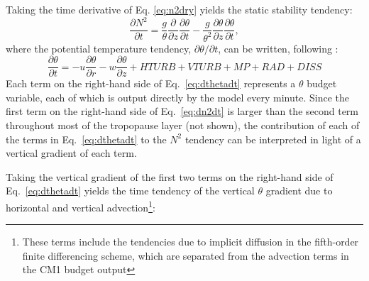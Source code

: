 \documentclass{ametsoc}
\begin{document}
Taking the time derivative of Eq. \ref{eq:n2dry} yields the static stability tendency:
   \begin{equation} \label{eq:dn2dt}
   \frac{\partial N^2}{\partial t} = \frac{g}{\theta}\frac{\partial}{\partial z}\frac{\partial \theta}{\partial t}-\frac{g}{\theta^2}\frac{\partial \theta}{\partial z}\frac{\partial \theta}{\partial t},
   \end{equation}
where the potential temperature tendency, $\partial \theta/\partial t$, can be written, following \cite{Bryan2017}:
   \begin{equation} \label{eq:dthetadt}
   \frac{\partial \theta}{\partial t} = -u\frac{\partial\theta}{\partial r}-w\frac{\partial \theta}{\partial z}+HTURB+VTURB+MP+RAD+DISS
   \end{equation}
Each term on the right-hand side of Eq.~\ref{eq:dthetadt} represents a $\theta$ budget variable, each of which is output directly by the model every minute.
Since the first term on the right-hand side of Eq.~\ref{eq:dn2dt} is larger than the second term throughout most of the tropopause layer (not shown), the contribution of each of the terms in Eq.~\ref{eq:dthetadt} to the $N^2$ tendency can be interpreted in light of a vertical gradient of each term.

Taking the vertical gradient of the first two terms on the right-hand side of Eq.~\ref{eq:dthetadt} yields the time tendency of the vertical $\theta$ gradient due to horizontal and vertical advection\footnote{These terms include the tendencies due to implicit diffusion in the fifth-order finite differencing scheme, which are separated from the advection terms in the CM1 budget output}:
\end{document}

